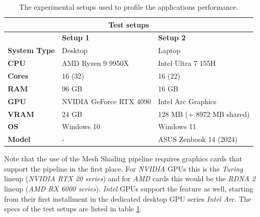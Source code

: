 \begin{table}[h]          %
    \begin{tabular}{|lll|}
        \hline
        \multicolumn{3}{|c|}{\textbf{Test setups}}                                                                              \\ \hline
        \multicolumn{1}{|l|}{}                     & \multicolumn{1}{l|}{\textbf{Setup 1}}          & \textbf{Setup 2}          \\ \hline
        \multicolumn{1}{|l|}{\textbf{System Type}} & \multicolumn{1}{l|}{Desktop}                   & Laptop                    \\
        \multicolumn{1}{|l|}{\textbf{CPU}}         & \multicolumn{1}{l|}{AMD Ryzen 9 9950X}         & Intel Ultra 7 155H        \\
        \multicolumn{1}{|l|}{\textbf{Cores}}       & \multicolumn{1}{l|}{16 (32)}                   & 16 (22)                   \\
        \multicolumn{1}{|l|}{\textbf{RAM}}         & \multicolumn{1}{l|}{96 GB}                     & 16 GB                     \\
        \multicolumn{1}{|l|}{\textbf{GPU}}         & \multicolumn{1}{l|}{NVIDIA GeForce RTX 4090}   & Intel Arc Graphics        \\
        \multicolumn{1}{|l|}{\textbf{VRAM}}        & \multicolumn{1}{l|}{24 GB}                     & 128 MB (+ 8972 MB shared) \\
        \multicolumn{1}{|l|}{\textbf{OS}}          & \multicolumn{1}{l|}{Windows 10}                & Windows 11                \\
        \multicolumn{1}{|l|}{\textbf{Model}}       & \multicolumn{1}{l|}{-}                         & ASUS Zenbook 14 (2024)    \\ \hline
    \end{tabular}
    \caption{The experimental setups used to profile the applications performance.}
    \label{tbl:hardware-setup}
\end{table}

\noindent
Note that the use of the Mesh Shading pipeline requires graphics cards that support the pipeline in the first place. 
For \emph{NVIDIA} \ac{GPU}s this is the \emph{Turing} lineup (\emph{NVIDIA RTX 20 series}) and for \emph{AMD} cards 
this would be the \emph{RDNA 2} lineup (\emph{AMD RX 6000 series}). \emph{Intel} \ac{GPU}s support the feature as 
well, starting from their first installment in the dedicated desktop \ac{GPU} series \emph{Intel Arc}. The specs of 
the test setups are listed in table \ref{tbl:hardware-setup}. \\



